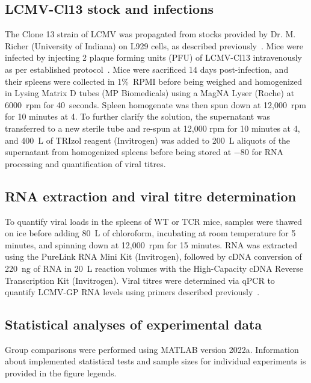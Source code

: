 \subsection{LCMV-Cl13 stock and infections}

The Clone 13 strain of LCMV was propagated from stocks provided by Dr. M. Richer (University of Indiana) on L929 cells, as described previously~\cite{jamaleddine2022chronic}. Mice were infected by injecting 2 plaque forming units (PFU) of LCMV-Cl13 intravenously as per established protocol~\cite{wherry2003viral,richer2013pathogen}. Mice were sacrificed 14 days post-infection, and their spleens were collected in 1\%~RPMI before being weighed and homogenized in Lysing Matrix D tubes (MP Biomedicals) using a MagNA Lyser (Roche) at 6000~rpm for 40~seconds. Spleen homogenate was then spun down at 12,000~rpm for 10 minutes at 4. To further clarify the solution, the supernatant was transferred to a new sterile tube and re-spun at 12,000 rpm for 10 minutes at 4, and 400~\textmu{}L of TRIzol reagent (Invitrogen) was added to 200~\textmu{}L aliquots of the supernatant from homogenized spleens before being stored at $-80$ for RNA processing and quantification of viral titres.

\subsection{RNA extraction and viral titre determination}

To quantify viral loads in the spleens of WT or TCR\textbeta{}\KO{} mice, samples were thawed on ice before adding 80~\textmu{}L of chloroform, incubating at room temperature for 5 minutes, and spinning down at 12,000~rpm for 15 minutes. RNA was extracted using the PureLink RNA Mini Kit (Invitrogen), followed by cDNA conversion of 220~ng of RNA in 20~\textmu{}L reaction volumes with the High-Capacity cDNA Reverse Transcription Kit (Invitrogen). Viral titres were determined via qPCR to quantify LCMV-GP RNA levels using primers described previously~\cite{welsh2008lymphocytic}.

\subsection{Statistical analyses of experimental data}

Group comparisons were performed using MATLAB version 2022a. Information about implemented statistical tests and sample sizes for individual experiments is provided in the figure legends.

